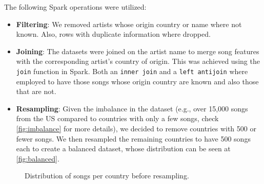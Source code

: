 \documentclass{article}
\begin{document}
The following Spark operations were utilized:
\begin{itemize}
    \item \textbf{Filtering}: We removed artists whose origin country or name where not known. Also, rows with duplicate information where dropped.
    \item \textbf{Joining}: The datasets were joined on the artist name to merge song features with the corresponding artist's country of origin. This was achieved using the \texttt{join} function in Spark. Both an \texttt{inner join} and a \texttt{left antijoin} where employed to have those songs whose origin country are known and also those that are not.
    \item \textbf{Resampling}: Given the imbalance in the dataset (e.g., over 15,000 songs from the US compared to countries with only a few songs, check \autoref{fig:imbalance} for more details), we decided to remove countries with 500 or fewer songs. We then resampled the remaining countries to have 500 songs each to create a balanced dataset, whose distribution can be seen at \autoref{fig:balanced}.
\end{itemize}

\begin{figure}[H]
    \centering
    \noindent
    \caption{Distribution of songs per country before resampling.}
    \label{fig:imbalance}
\end{figure}
\end{document}
